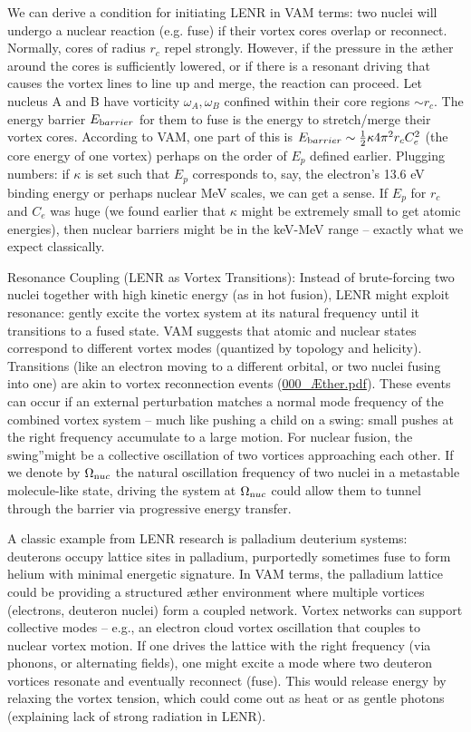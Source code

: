 We can derive a condition for initiating LENR in VAM terms: two nuclei will undergo a nuclear reaction (e.g. fuse) if their vortex cores overlap or reconnect. Normally, cores of radius $r_c$ repel strongly. However, if the pressure in the æther around the cores is sufficiently lowered, or if there is a resonant driving that causes the vortex lines to line up and merge, the reaction can proceed. Let nucleus A and B have vorticity $\omega_A, \omega_B$ confined within their core regions $\sim r_c$. The energy barrier $E_{\textrm barrier}$ for them to fuse is the energy to stretch/merge their vortex cores. According to VAM, one part of this is $E_{\textrm barrier}\sim \frac{1}{2}\kappa 4\pi^2 r_c C_e^2$ (the core energy of one vortex) perhaps on the order of $E_p$ defined earlier. Plugging numbers: if $\kappa$ is set such that $E_p$ corresponds to, say, the electron's 13.6 eV binding energy or perhaps nuclear MeV scales, we can get a sense. If $E_p$ for $r_c$ and $C_e$ was huge (we found earlier that $\kappa$ might be extremely small to get atomic energies), then nuclear barriers might be in the keV-MeV range – exactly what we expect classically.


Resonance Coupling (LENR as Vortex Transitions): Instead of brute-forcing two nuclei together with high kinetic energy (as in hot fusion), LENR might exploit resonance: gently excite the vortex system at its natural frequency until it transitions to a fused state. VAM suggests that atomic and nuclear states correspond to different vortex modes (quantized by topology and helicity). Transitions (like an electron moving to a different orbital, or two nuclei fusing into one) are akin to vortex reconnection events (\href{file://file-f6wuuwzjgr23npodmed4pi%23:~:text=in%20a%20dynamic%20picture,%20absorption,electron%20changing%20orbitals/}{000_Æther.pdf}). These events can occur if an external perturbation matches a normal mode frequency of the combined vortex system – much like pushing a child on a swing: small pushes at the right frequency accumulate to a large motion. For nuclear fusion, the \grqq swing\textquotedblright might be a collective oscillation of two vortices approaching each other. If we denote by $\Omega_{\textrm nuc}$ the natural oscillation frequency of two nuclei in a metastable molecule-like state, driving the system at $\Omega_{\textrm nuc}$ could allow them to tunnel through the barrier via progressive energy transfer.


A classic example from LENR research is palladium deuterium systems: deuterons occupy lattice sites in palladium, purportedly sometimes fuse to form helium with minimal energetic signature. In VAM terms, the palladium lattice could be providing a structured æther environment where multiple vortices (electrons, deuteron nuclei) form a coupled network. Vortex networks can support collective modes – e.g., an electron cloud vortex oscillation that couples to nuclear vortex motion. If one drives the lattice with the right frequency (via phonons, or alternating fields), one might excite a mode where two deuteron vortices resonate and eventually reconnect (fuse). This would release energy by relaxing the vortex tension, which could come out as heat or as gentle photons (explaining lack of strong radiation in LENR).


